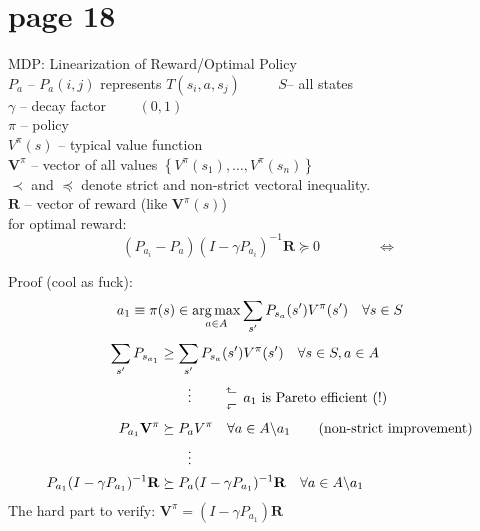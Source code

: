 \section*{page 18}

MDP: Linearization of Reward/Optimal Policy\\

$P_a$ -- $P_a(i,j)$ represents $T(s_i, a, s_j)$ $\qquad$ $S$-- all states\\
$\gamma$ -- decay factor $\qquad(0,1)$\\
$\pi$ -- policy \\
$V^\pi(s)$ -- typical value function\\
$\mathbf{V}^\pi$ -- vector of all values $\left\{ V^\pi(s_1),\ldots,V^\pi(s_n)\right\}$\\
$\prec$ and $\preceq$ denote strict and non-strict vectoral inequality.\\
$\mathbf{R}$ -- vector of reward (like $\mathbf{V}^\pi(s)$)\\

for optimal reward:
\begin{equation*}
\left( P_{a_i} - P_a \right) (I-\gamma P_{a_i})^{-1} \mathbf{R} \succeq 0\qquad\qquad\Leftrightarrow
\end{equation*}

Proof (cool as fuck):
\begin{equation*}
a_1 \equiv \pi(s) \in \operatorname*{arg\,max}_{a\in A} \sum_{s^\prime} P_{s_a}(s^\prime)V^\pi(s^\prime) \quad\forall s \in S
\end{equation*}
\begin{align*}
\sum_{s^\prime}P_{s_{a_1}} & \geq \sum_{s^\prime}P_{s_a}(s^\prime)V^\pi(s^\prime) \quad \forall s \in S, a \in A \\
& \qquad \vdots \qquad \begin{array}{c} \rotatebox{90}{$\Rsh$} \\ \rotatebox{90}{$\Lsh$}  \end{array}  a_1 \text{\ is Pareto efficient (!)} \\
P_{a_1} \mathbf{V}^\pi & \succeq P_a V^\pi \quad \forall a\in A \backslash a_1\qquad \text{(non-strict improvement)}\\
& \qquad \vdots \\
P_{a_1}(I - \gamma P_{a_1})^{-1} \mathbf{R} &  \succeq P_a(I-\gamma P_{a_1})^{-1} \mathbf{R} \quad \forall a \in A\backslash a_1 
\end{align*}
The hard part to verify: $\mathbf{V}^\pi = (I-\gamma P_{a_1})\mathbf{R}$




